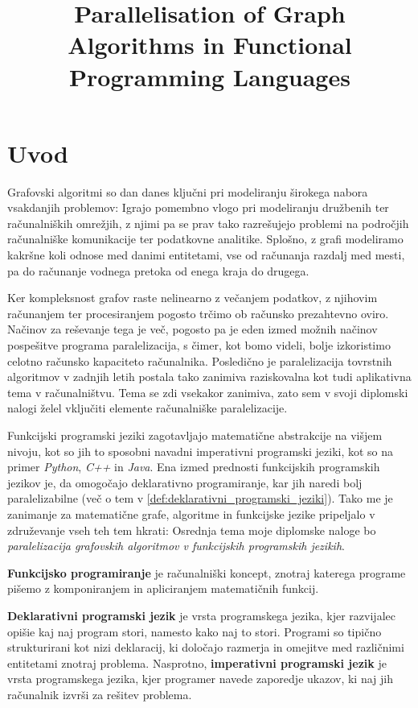 \documentclass[mat1, tisk]{fmfdelo}
\title{Parallelisation of Graph Algorithms in Functional Programming Languages}
\begin{document}
\section{Uvod}

Grafovski algoritmi so dan danes ključni pri modeliranju širokega nabora vsakdanjih problemov: 
Igrajo pomembno vlogo pri modeliranju družbenih ter računalniških omrežjih, z njimi pa se prav tako razrešujejo 
problemi na področjih računalniške komunikacije ter podatkovne analitike. Splošno, z grafi  modeliramo kakršne 
koli odnose med danimi entitetami, vse od računanja razdalj med mesti, pa do računanje vodnega pretoka 
od enega kraja do drugega.

Ker kompleksnost grafov raste nelinearno z večanjem podatkov, z njihovim računanjem ter procesiranjem pogosto trčimo
ob računsko prezahtevno oviro. Načinov za reševanje tega je več, pogosto pa je eden izmed možnih načinov pospešitve
programa paralelizacija, s čimer, kot bomo videli, bolje izkoristimo celotno računsko kapaciteto računalnika.
Posledično je paralelizacija tovrstnih algoritmov v zadnjih letih postala tako zanimiva raziskovalna kot
tudi aplikativna tema v računalništvu.  Tema se zdi vsekakor zanimiva, zato sem v svoji diplomski nalogi želel 
vključiti elemente računalniške paralelizacije.

Funkcijski programski jeziki zagotavljajo matematične abstrakcije na višjem nivoju, kot so jih to sposobni navadni
imperativni programski jeziki, kot so na primer \textit{Python}, \textit{C++} in \textit{Java}. 
Ena izmed prednosti funkcijskih programskih jezikov je, da omogočajo deklarativno programiranje, 
kar jih naredi bolj paralelizabilne (več o tem v \ref{def:deklarativni_programski_jeziki}). Tako me je zanimanje za matematične grafe, algoritme
in funkcijske jezike pripeljalo v združevanje vseh teh tem hkrati: Osrednja tema moje diplomske naloge bo
\textit{paralelizacija grafovskih algoritmov v funkcijskih programskih jezikih}.

\begin{definicija}
  \textbf{Funkcijsko programiranje} je računalniški koncept, znotraj katerega programe
  pišemo z komponiranjem in apliciranjem matematičnih funkcij. 
\end{definicija}

\begin{definicija} \label{def:deklarativni_programski_jeziki}
  \textbf{Deklarativni programski jezik} je vrsta programskega jezika, kjer razvijalec opišie kaj naj program stori, 
  namesto kako naj to stori. Programi so tipično strukturirani kot nizi deklaracij, ki določajo razmerja in omejitve
  med različnimi entitetami znotraj problema. 
  Nasprotno, \textbf{imperativni programski jezik} je vrsta programskega jezika, kjer programer navede zaporedje ukazov,
  ki naj jih računalnik izvrši za rešitev problema.
\end{definicija}
\end{document}
